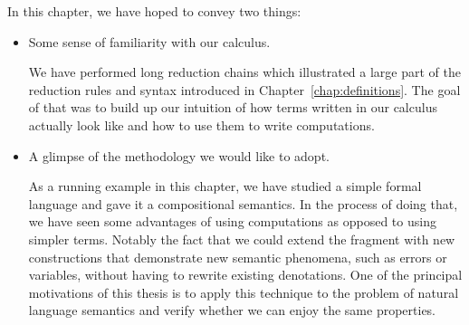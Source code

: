 In this chapter, we have hoped to convey two things:

\begin{itemize}
\item Some sense of familiarity with our calculus. 

  We have performed long reduction chains which illustrated a large part of
  the reduction rules and syntax introduced in
  Chapter~\ref{chap:definitions}. The goal of that was to build up our
  intuition of how terms written in our calculus actually look like and how
  to use them to write computations.

\item A glimpse of the methodology we would like to adopt.

  As a running example in this chapter, we have studied a simple formal
  language and gave it a compositional semantics. In the process of doing
  that, we have seen some advantages of using computations as opposed to
  using simpler terms. Notably the fact that we could extend the fragment
  with new constructions that demonstrate new semantic phenomena, such as
  errors or variables, without having to rewrite existing denotations. One
  of the principal motivations of this thesis is to apply this technique to
  the problem of natural language semantics and verify whether we can enjoy
  the same properties.
\end{itemize}
